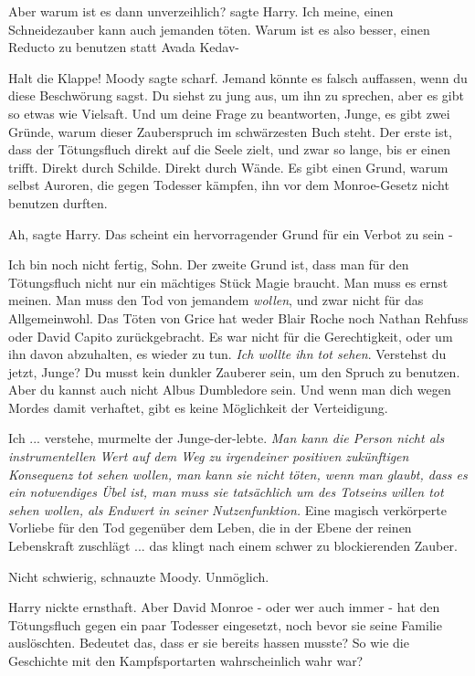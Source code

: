 \glqq{}Aber warum ist es dann unverzeihlich?\grqq{} sagte Harry. \glqq{}Ich meine,
einen Schneidezauber kann auch jemanden töten. Warum ist es also besser, einen
Reducto zu benutzen statt Avada Kedav-\grqq{}

\glqq{}Halt die Klappe!\grqq{} Moody sagte scharf. \glqq{}Jemand könnte es falsch
auffassen, wenn du diese Beschwörung sagst. Du siehst zu jung aus, um ihn zu
sprechen, aber es gibt so etwas wie Vielsaft. Und um deine Frage zu beantworten,
Junge, es gibt zwei Gründe, warum dieser Zauberspruch im schwärzesten Buch
steht. Der erste ist, dass der Tötungsfluch direkt auf die Seele zielt, und zwar
so lange, bis er einen trifft. Direkt durch Schilde. Direkt durch Wände. Es gibt
einen Grund, warum selbst Auroren, die gegen Todesser kämpfen, ihn vor dem
Monroe-Gesetz nicht benutzen durften.\grqq{}

\glqq{}Ah\grqq{}, sagte Harry. \glqq{}Das scheint ein hervorragender Grund für ein
Verbot zu sein -\grqq{}

\glqq{}Ich bin noch nicht fertig, Sohn. Der zweite Grund ist, dass man für den
Tötungsfluch nicht nur ein mächtiges Stück Magie braucht. Man muss es ernst
meinen. Man muss den Tod von jemandem \emph{wollen}, und zwar nicht für das
Allgemeinwohl. Das Töten von Grice hat weder Blair Roche noch Nathan Rehfuss
oder David Capito zurückgebracht. Es war nicht für die Gerechtigkeit, oder um
ihn davon abzuhalten, es wieder zu tun. \emph{Ich wollte ihn tot sehen}.
Verstehst du jetzt, Junge? Du musst kein dunkler Zauberer sein, um den Spruch zu
benutzen. Aber du kannst auch nicht Albus Dumbledore sein. Und wenn man dich
wegen Mordes damit verhaftet, gibt es keine Möglichkeit der Verteidigung.\grqq{}

\glqq{}Ich ... verstehe\grqq{}, murmelte der Junge-der-lebte. \emph{Man kann die
Person nicht als instrumentellen Wert auf dem Weg zu irgendeiner positiven
zukünftigen Konsequenz tot sehen wollen, man kann sie nicht töten, wenn man
glaubt, dass es ein notwendiges Übel ist, man muss sie tatsächlich um des
Totseins willen tot sehen wollen, als Endwert in seiner Nutzenfunktion.} \glqq{}
Eine magisch verkörperte Vorliebe für den Tod gegenüber dem Leben, die in der
Ebene der reinen Lebenskraft zuschlägt ... das klingt nach einem schwer zu
blockierenden Zauber.\grqq{}

\glqq{}Nicht schwierig\grqq{}, schnauzte Moody. \glqq{}Unmöglich.\grqq{}

Harry nickte ernsthaft. \glqq{}Aber David Monroe - oder wer auch immer - hat den
Tötungsfluch gegen ein paar Todesser eingesetzt, noch bevor sie seine Familie
auslöschten. Bedeutet das, dass er sie bereits hassen musste? So wie die
Geschichte mit den Kampfsportarten wahrscheinlich wahr war?\grqq{}

